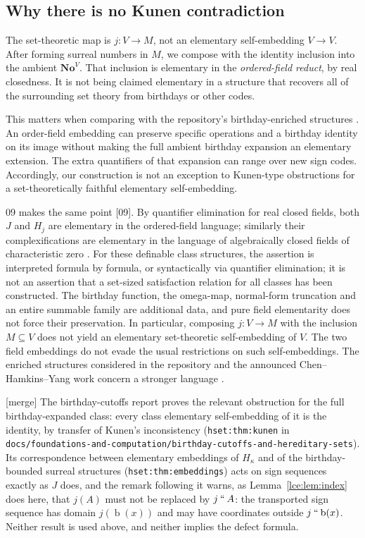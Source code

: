 \documentclass[11pt,letterpaper]{article}
\numberwithin{equation}{section}
\theoremstyle{definition}
\theoremstyle{remark}
\newcommand{\No}{\mathbf{No}}
\newcommand{\bd}{\operatorname{b}}
\newcommand{\imset}[2]{#1\mathbin{``}#2}
\newcommand{\leref}[1]{Lemma~\ref{#1}}
\newcommand{\src}[1]{\textup{\textsf{\small[#1]}}}%
\newcommand{\mergetag}{\textup{\textsf{\small[merge]}}}%
\newcommand{\lbl}[1]{\nolinkurl{#1}}%
\newcommand{\fn}[1]{\nolinkurl{#1}}%
\begin{document}
\subsection{Why there is no Kunen contradiction}
The set-theoretic map is $j:V\to M$, not an elementary self-embedding
$V\to V$. After forming surreal numbers in $M$, we compose with the
identity inclusion into the ambient $\No^V$. That inclusion is elementary
in the \emph{ordered-field reduct}, by real closedness. It is not being
claimed elementary in a structure that recovers all of the surrounding
set theory from birthdays or other codes.

This matters when comparing with the repository's birthday-enriched
structures \cite{RepoBirthday}. An order-field embedding can preserve
specific operations and a birthday identity on its image without making
the full ambient birthday expansion an elementary extension. The extra
quantifiers of that expansion can range over new sign codes. Accordingly,
our construction is not an exception to Kunen-type obstructions for a
set-theoretically faithful elementary self-embedding.

09 makes the same point \src{09}. By quantifier elimination for real closed
fields, both $J$ and $H_j$ are elementary in the ordered-field language;
similarly their complexifications are elementary in the language of
algebraically closed fields of characteristic zero \cite{Marker}. For these
definable class structures, the assertion is interpreted formula by
formula, or syntactically via quantifier elimination; it is not an
assertion that a set-sized satisfaction relation for all classes has been
constructed. The birthday function, the omega-map, normal-form truncation
and an entire summable family are additional data, and pure field
elementarity does not force their preservation. In particular, composing
$j:V\to M$ with the inclusion $M\subseteq V$ does not yield an elementary
set-theoretic self-embedding of $V$. The two field embeddings do not evade
the usual restrictions on such self-embeddings. The enriched structures
considered in the repository and the announced Chen--Hamkins--Yang work
concern a stronger language \cite{RepoBirthday,CHY}.

\mergetag{} The birthday-cutoffs report proves the relevant obstruction for
the full birthday-expanded class: every class elementary self-embedding of
it is the identity, by transfer of Kunen's inconsistency
(\lbl{hset:thm:kunen} in
\fn{docs/foundations-and-computation/birthday-cutoffs-and-hereditary-sets}).
Its correspondence between elementary embeddings of $H_\kappa$ and of the
birthday-bounded surreal structures (\lbl{hset:thm:embeddings}) acts on
sign sequences exactly as $J$ does, and the remark following it warns, as
\leref{lce:lem:index} does here, that $j(A)$ must not be replaced by
$\imset jA$: the transported sign sequence has domain $j(\bd(x))$ and may
have coordinates outside $\imset j{\bd(x)}$. Neither result is used above,
and neither implies the defect formula.
\end{document}
